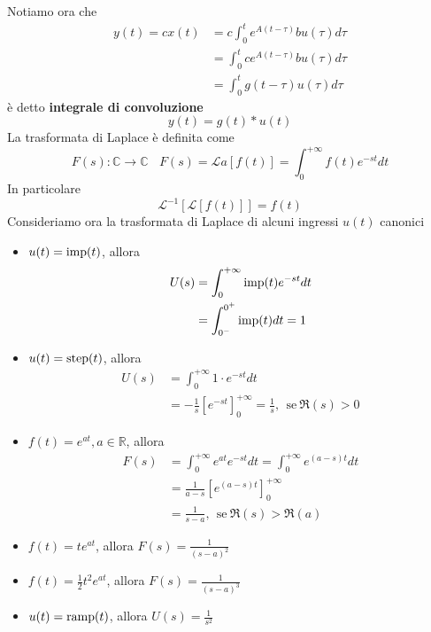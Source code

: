 Notiamo ora che
\begin{equation*}
	\begin{aligned}
		y(t) =cx(t) & =c\int ^t_0 e^{A(t-\tau)} bu(\tau) d\tau         \\
		            & =\int ^t_0\boxed{ce^{A(t-\tau)} b} u(\tau) d\tau \\
		            & =\int ^t_0\boxed{g(t-\tau)} u(\tau) d\tau        
	\end{aligned}
\end{equation*}
è detto \textbf{integrale di convoluzione}
\begin{equation}
	y(t) =g(t) *u(t)
\end{equation}
La trasformata di Laplace è definita come
\begin{equation}
	F(s) :\mathbb{C}\to \mathbb{C} \ \ \ \ F(s) =\mathcal{L} a[ f(t)] =\int ^{+\infty }_0 f(t) e^{-st} dt
\end{equation}
In particolare
\begin{equation*}
	\mathcal{L}^{-1}[\mathcal{L}[ f(t)]] =f(t)
\end{equation*}
Consideriamo ora la trasformata di Laplace di alcuni ingressi $u(t)$ canonici
\begin{itemize}
	\item $u(t) =\operatorname{imp}(t)$, allora\begin{equation*}
	      \begin{aligned}
	      	U(s) & =\int ^{+\infty }_0\operatorname{imp}(t) e^{-st} dt \\
	      	     & =\int ^{0^{+}}_{0^{-}}\operatorname{imp}(t) dt=1    
	      \end{aligned}
	\end{equation*}
	\item $u(t) =\operatorname{step}(t)$, allora\begin{equation*}
	      \begin{aligned}
	      	U(s) & =\int ^{+\infty }_0 1\cdotp e^{-st} dt                                                   \\
	      	     & =-\frac{1}{s}\left[ e^{-st}\right]^{+\infty }_0 =\frac{1}{s} ,\ \ \text{se} \ \Re(s)  >0 
	      \end{aligned}
	\end{equation*}
	\item $f(t) =e^{at} ,a\in \mathbb{R}$, allora\begin{equation*}
	      \begin{aligned}
	      	F(s) & =\int ^{+\infty }_0 e^{at} e^{-st} dt=\int ^{+\infty }_0 e^{(a-s) t} dt \\
	      	     & =\frac{1}{a-s}\left[ e^{(a-s) t}\right]^{+\infty }_0                    \\
	      	     & =\frac{1}{s-a} ,\ \ \text{se} \ \Re(s)  >\Re(a)                         
	      \end{aligned}
	\end{equation*}
	\item $f(t) =te^{at}$, allora $F(s) =\frac{1}{(s-a)^2}$
	\item $f(t) =\frac{1}{2} t^2 e^{at}$, allora $F(s) =\frac{1}{(s-a)^3}$
	\item $u(t) =\operatorname{ramp}(t)$, allora $U(s) =\frac{1}{s^2}$
\end{itemize}

